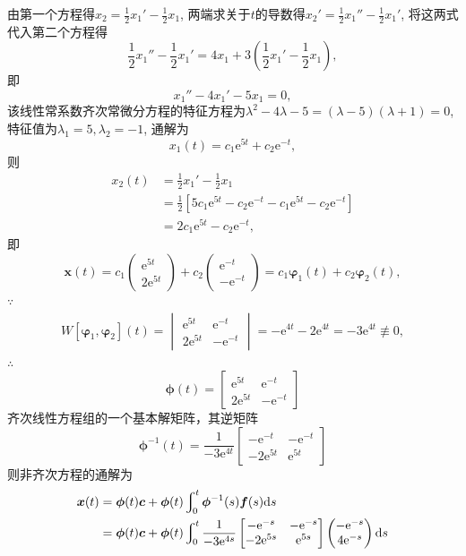 \documentclass[12pt,UTF8]{ctexart}
\newcommand{\Int}[4]{\varint\nolimits_{#1}^{#2}#3\mathrm d#4}
\newcommand{\me}[0]{\mathrm e}
\begin{document}
\begin{enumerate}
由第一个方程得$x_2=\frac12x_1'-\frac12x_1$, 两端求关于$t$的导数得$x_2'=\frac12x_1''-\frac12x_1'$, 将这两式代入第二个方程得
\[\frac12x_1''-\frac12x_1'=4x_1+3(\frac12x_1'-\frac12x_1),\]
即\[x_1''-4x_1'-5x_1=0,\]
该线性常系数齐次常微分方程的特征方程为$\lambda^2-4\lambda-5=(\lambda-5)(\lambda+1)=0$, 特征值为$\lambda_1=5,\lambda_2=-1$, 通解为
\[x_1(t)=c_1\me^{5t}+c_2\me^{-t},\]
则\[\begin{aligned}
x_2(t)&=\frac12x_1'-\frac12x_1\\
&=\frac12[5c_1\me^{5t}-c_2\me^{-t}-c_1\me^{5t}-c_2\me^{-t}]\\
&=2c_1\me^{5t}-c_2\me^{-t},
\end{aligned}\]
即
\[
\bm x(t)=c_1\begin{pmatrix}\me^{5t}\\2\me^{5t}\end{pmatrix}+c_2\begin{pmatrix}\me^{-t}\\-\me^{-t}\end{pmatrix}=c_1\bm\varphi_1(t)+c_2\bm\varphi_2(t),
\]
$\because$
\[\begin{aligned}
W[\bm\varphi_1,\bm\varphi_2](t)=\begin{vmatrix}
\me^{5t}&\me^{-t}
\\2\me^{5t}&-\me^{-t}
\end{vmatrix}=-\me^{4t}-2\me^{4t}=-3\me^{4t}\not\equiv0,
\end{aligned}\]
$\therefore$
\[
\bm\phi(t)=\begin{bmatrix}
\me^{5t}&\me^{-t}
\\2\me^{5t}&-\me^{-t}
\end{bmatrix}
\]
齐次线性方程组的一个基本解矩阵，其逆矩阵
\[
\bm\phi^{-1}(t)=\frac1{-3\me^{4t}}\begin{bmatrix}
-\me^{-t}&-\me^{-t}\\
-2\me^{5t}&\me^{5t}
\end{bmatrix}
\]
则非齐次方程的通解为
\[\begin{aligned}
\bm x(t)&=\bm\phi(t)\bm c+\bm\phi(t)\Int0t{\bm\phi^{-1}(s)\bm f(s)}s\\
&=\bm\phi(t)\bm c+\bm\phi(t)\Int0t{\frac1{-3\me^{4s}}\begin{bmatrix}
-\me^{-s}&-\me^{-s}\\
-2\me^{5s}&\me^{5s}
\end{bmatrix}\begin{pmatrix}
-\me^{-s}\\
4\me^{-s}
\end{pmatrix}}s\\

\end{aligned}\]
\end{enumerate}
\end{document}
